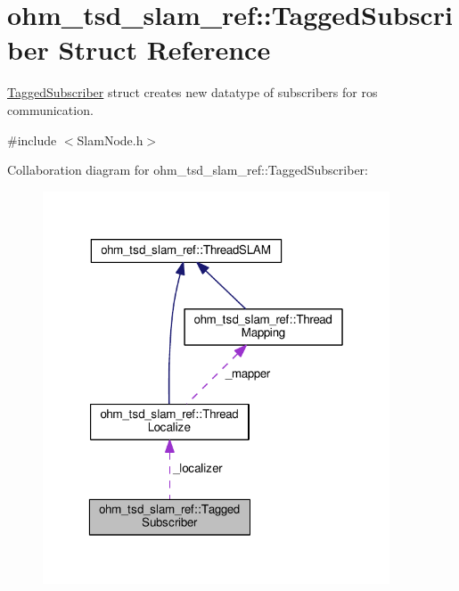 \hypertarget{structohm__tsd__slam__ref_1_1TaggedSubscriber}{\section{ohm\-\_\-tsd\-\_\-slam\-\_\-ref\-:\-:Tagged\-Subscriber Struct Reference}
\label{structohm__tsd__slam__ref_1_1TaggedSubscriber}
}


\hyperlink{structohm__tsd__slam__ref_1_1TaggedSubscriber}{Tagged\-Subscriber} struct creates new datatype of subscribers for ros communication.  




{\ttfamily \#include $<$Slam\-Node.\-h$>$}



Collaboration diagram for ohm\-\_\-tsd\-\_\-slam\-\_\-ref\-:\-:Tagged\-Subscriber\-:\nopagebreak
\begin{figure}[H]
\begin{center}
\leavevmode
\includegraphics[width=292pt]{structohm__tsd__slam__ref_1_1TaggedSubscriber__coll__graph}
\end{center}
\end{figure}
